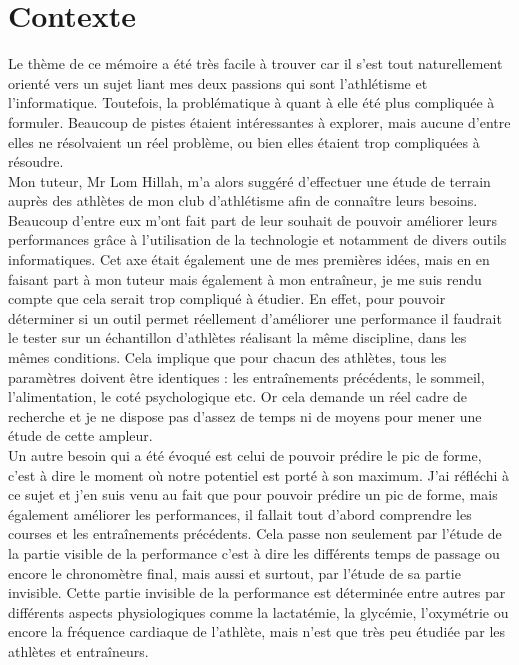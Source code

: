 \chapter*{Contexte}
\label{chap:contexte}

Le thème de ce mémoire a été très facile à trouver car il s'est tout naturellement orienté vers un sujet liant mes deux passions qui sont l'athlétisme et l'informatique. Toutefois, la problématique à quant à elle été plus compliquée à formuler. Beaucoup de pistes étaient intéressantes à explorer, mais aucune d'entre elles ne résolvaient un réel problème, ou bien elles étaient trop compliquées à résoudre.\\

Mon tuteur, Mr Lom Hillah, m'a alors suggéré d'effectuer une étude de terrain auprès des athlètes de mon club d'athlétisme afin de connaître leurs besoins. \\

Beaucoup d'entre eux m'ont fait part de leur souhait de pouvoir améliorer leurs performances grâce à l'utilisation de la technologie et notamment de divers outils informatiques. Cet axe était également une de mes premières idées, mais en en faisant part à mon tuteur mais également à mon entraîneur, je me suis rendu compte que cela serait trop compliqué à étudier. En effet, pour pouvoir déterminer si un outil permet réellement d'améliorer une performance il faudrait le tester sur un échantillon d'athlètes réalisant la même discipline, dans les mêmes conditions. Cela implique que pour chacun des athlètes, tous les paramètres doivent être identiques : les entraînements précédents, le sommeil, l'alimentation, le coté psychologique etc. Or cela demande un réel cadre de recherche et je ne dispose pas d'assez de temps ni de moyens pour mener une étude de cette ampleur. \\

Un autre besoin qui a été évoqué est celui de pouvoir prédire le pic de forme, c'est à dire le moment où notre potentiel est porté à son maximum. J'ai réfléchi à ce sujet et j'en suis venu au fait que pour pouvoir prédire un pic de forme, mais également améliorer les performances, il fallait tout d'abord comprendre les courses et les entraînements précédents. Cela passe non seulement par l'étude de la partie visible de la performance c'est à dire les différents temps de passage ou encore le chronomètre final, mais aussi et surtout, par l'étude de sa partie invisible. Cette partie invisible de la performance est déterminée entre autres par différents aspects physiologiques comme la lactatémie, la glycémie, l'oxymétrie ou encore la fréquence cardiaque de l'athlète, mais n'est que très peu étudiée par les athlètes et entraîneurs.\\



